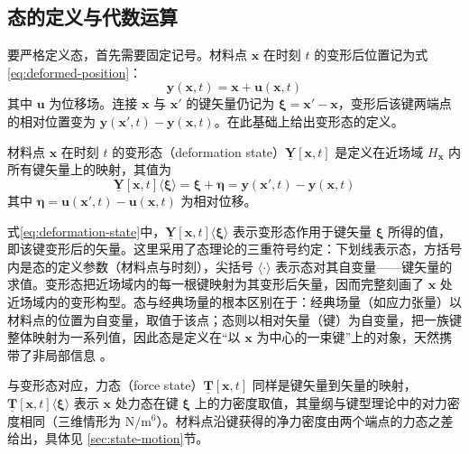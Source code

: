 \subsection{态的定义与代数运算}\label{sec:state-defs}

要严格定义态，首先需要固定记号。材料点 $\mathbf{x}$ 在时刻 $t$ 的变形后位置记为式\eqref{eq:deformed-position}：
\begin{equation}
  \mathbf{y}(\mathbf{x},t)=\mathbf{x}+\mathbf{u}(\mathbf{x},t)
  \label{eq:deformed-position}
\end{equation}
其中 $\mathbf{u}$ 为位移场。连接 $\mathbf{x}$ 与 $\mathbf{x}'$ 的键矢量仍记为 $\boldsymbol{\xi}=\mathbf{x}'-\mathbf{x}$，变形后该键两端点的相对位置变为 $\mathbf{y}(\mathbf{x}',t)-\mathbf{y}(\mathbf{x},t)$。在此基础上给出变形态的定义。

\begin{definition}
  材料点 $\mathbf{x}$ 在时刻 $t$ 的变形态（deformation state）$\underline{\mathbf{Y}}[\mathbf{x},t]$ 是定义在近场域 $H_{\mathbf{x}}$ 内所有键矢量上的映射，其值为
  \begin{equation}
    \underline{\mathbf{Y}}[\mathbf{x},t]\langle\boldsymbol{\xi}\rangle=\boldsymbol{\xi}+\boldsymbol{\eta}=\mathbf{y}(\mathbf{x}',t)-\mathbf{y}(\mathbf{x},t)
    \label{eq:deformation-state}
  \end{equation}
  其中 $\boldsymbol{\eta}=\mathbf{u}(\mathbf{x}',t)-\mathbf{u}(\mathbf{x},t)$ 为相对位移。
\end{definition}

式\eqref{eq:deformation-state}中，$\underline{\mathbf{Y}}[\mathbf{x},t]\langle\boldsymbol{\xi}\rangle$ 表示变形态作用于键矢量 $\boldsymbol{\xi}$ 所得的值，即该键变形后的矢量。这里采用了态理论的三重符号约定：下划线表示态，方括号内是态的定义参数（材料点与时刻），尖括号 $\langle\cdot\rangle$ 表示态对其自变量——键矢量的求值。变形态把近场域内的每一根键映射为其变形后矢量，因而完整刻画了 $\mathbf{x}$ 处近场域内的变形构型。态与经典场量的根本区别在于：经典场量（如应力张量）以材料点的位置为自变量，取值于该点；态则以相对矢量（键）为自变量，把一族键整体映射为一系列值，因此态是定义在“以 $\mathbf{x}$ 为中心的一束键”上的对象，天然携带了非局部信息 \cite{Silling2007}。

与变形态对应，力态（force state）$\underline{\mathbf{T}}[\mathbf{x},t]$ 同样是键矢量到矢量的映射，$\underline{\mathbf{T}}[\mathbf{x},t]\langle\boldsymbol{\xi}\rangle$ 表示 $\mathbf{x}$ 处力态在键 $\boldsymbol{\xi}$ 上的力密度取值，其量纲与键型理论中的对力密度相同（三维情形为 $\mathrm{N/m^6}$）。材料点沿键获得的净力密度由两个端点的力态之差给出，具体见 \ref{sec:state-motion}节。

